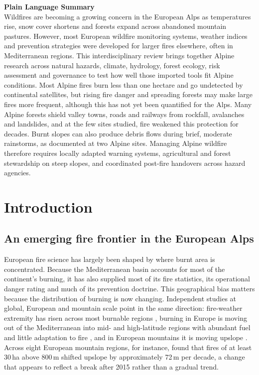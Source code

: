 \documentclass[11pt,a4paper]{article}
\begin{document}
\vspace{0.5em}
\noindent\textbf{Plain Language Summary}\\
Wildfires are becoming a growing concern in the European Alps as temperatures rise, snow cover shortens and forests expand across abandoned mountain pastures. However, most European wildfire monitoring systems, weather indices and prevention strategies were developed for larger fires elsewhere, often in Mediterranean regions. This interdisciplinary review brings together Alpine research across natural hazards, climate, hydrology, forest ecology, risk assessment and governance to test how well those imported tools fit Alpine conditions. Most Alpine fires burn less than one hectare and go undetected by continental satellites, but rising fire danger and spreading forests may make large fires more frequent, although this has not yet been quantified for the Alps. Many Alpine forests shield valley towns, roads and railways from rockfall, avalanches and landslides, and at the few sites studied, fire weakened this protection for decades. Burnt slopes can also produce debris flows during brief, moderate rainstorms, as documented at two Alpine sites. Managing Alpine wildfire therefore requires locally adapted warning systems, agricultural and forest stewardship on steep slopes, and coordinated post-fire handovers across hazard agencies.
\fi


\section{Introduction}
\label{sec:intro}

\subsection{An emerging fire frontier in the European Alps}

European fire science has largely been shaped by where burnt area is concentrated. Because the Mediterranean basin accounts for most of the continent's burning, it has also supplied most of its fire statistics, its operational danger rating and much of its prevention doctrine. This geographical bias matters because the distribution of burning is now changing. Independent studies at global, European and mountain scale point in the same direction: fire-weather extremity has risen across most burnable regions \citep{jones_global_2022}, burning in Europe is moving out of the Mediterranean into mid- and high-latitude regions with abundant fuel and little adaptation to fire \citep{miller_compounding_2025}, and in European mountains it is moving upslope \citep{beloiu_climatedriven_2026}. Across eight European mountain regions, for instance, \citet{beloiu_climatedriven_2026} found that fires of at least 30\,ha above 800\,m shifted upslope by approximately 72\,m per decade, a change that appears to reflect a break after 2015 rather than a gradual trend.
\end{document}
